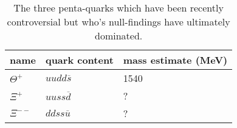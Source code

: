 \begin{table}
\begin{minipage}{\textwidth}
\begin{center}
\begin{singlespacing}

\caption[Penta-Quarks]{\label{tab:pentaquarks}The three penta-quarks which have been recently controversial but who's null-findings have ultimately dominated\cite{pdg}.}

\begin{tabular}{lp{9ex}p{14ex}}

\hline \hline

name & quark content & mass estimate (MeV) \\

\hline

$\Theta^+$ & $uudd\overline{s}$ & 1540 \\
$\Xi^+$ & $uuss\overline{d}$ & ? \\
$\Xi^{--}$ & $ddss\overline{u}$ & ? \\

\hline \hline

\end{tabular}

\end{singlespacing}
\end{center}
\end{minipage}
\end{table}
\vspace{20pt}